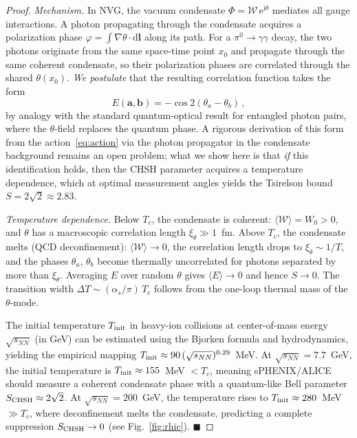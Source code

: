\documentclass[12pt,a4paper]{article}
\theoremstyle{plain}
\theoremstyle{definition}
\theoremstyle{remark}
\newcommand{\Wc}{\mathcal{W}}
\newcommand{\dd}{\mathrm{d}}
\newcommand{\ee}{\mathrm{e}}
\newcommand{\ii}{\mathrm{i}}
\newcommand{\QED}{\hfill$\blacksquare$}
\begin{document}
\begin{proof}
\emph{Mechanism.}  In NVG, the vacuum condensate
$\Phi = \Wc\,\ee^{\ii\theta}$ mediates all gauge interactions.
A photon propagating through the condensate acquires a
polarization phase $\varphi = \int \nabla\theta \cdot \dd\bm{l}$
along its path.  For a $\pi^0 \to \gamma\gamma$ decay,
the two photons originate from the same space-time point $x_0$
and propagate through the same coherent condensate, so their
polarization phases are correlated through the shared
$\theta(x_0)$.  \emph{We postulate} that the resulting
correlation function takes the form
\begin{equation}
  E(\bm{a},\bm{b})
  = -\cos 2(\theta_a - \theta_b)\,,
\end{equation}
by analogy with the standard quantum-optical result for
entangled photon pairs, where the $\theta$-field replaces
the quantum phase.  A rigorous derivation of this form from
the action~\eqref{eq:action} via the photon propagator in
the condensate background remains an open problem; what we
show here is that \emph{if} this identification holds, then
the CHSH parameter acquires a temperature dependence,
which at optimal measurement angles yields the Tsirelson bound
$S = 2\sqrt{2} \approx 2.83$.

\emph{Temperature dependence.}  Below $T_c$, the condensate
is coherent: $\langle\Wc\rangle = W_0 > 0$, and
$\theta$ has a macroscopic correlation length
$\xi_\theta \gg 1$~fm.  Above $T_c$, the condensate melts
(QCD deconfinement): $\langle\Wc\rangle \to 0$, the
correlation length drops to $\xi_\theta \sim 1/T$, and
the phases $\theta_a$, $\theta_b$ become thermally
uncorrelated for photons separated by more than $\xi_\theta$.
Averaging $E$ over random $\theta$ gives
$\langle E\rangle \to 0$ and hence $S \to 0$.
The transition width $\Delta T \sim (\alpha_s/\pi)\,T_c$
follows from the one-loop thermal mass of the $\theta$-mode.

The initial temperature $T_{\rm init}$ in heavy-ion collisions at center-of-mass energy $\sqrt{s_{NN}}$ (in GeV) can be estimated using the Bjorken formula and hydrodynamics, yielding the empirical mapping $T_{\rm init} \approx 90\,(\sqrt{s_{NN}})^{0.29}$~MeV. At $\sqrt{s_{NN}} = 7.7$~GeV, the initial temperature is $T_{\rm init} \approx 155$~MeV $< T_c$, meaning sPHENIX/ALICE should measure a coherent condensate phase with a quantum-like Bell parameter $S_{\rm CHSH} \approx 2\sqrt{2}$. At $\sqrt{s_{NN}} = 200$~GeV, the temperature rises to $T_{\rm init} \approx 280$~MeV $\gg T_c$, where deconfinement melts the condensate, predicting a complete suppression $S_{\rm CHSH} \to 0$ (see Fig.~\ref{fig:rhic}).
\QED
\end{proof}
\end{document}
